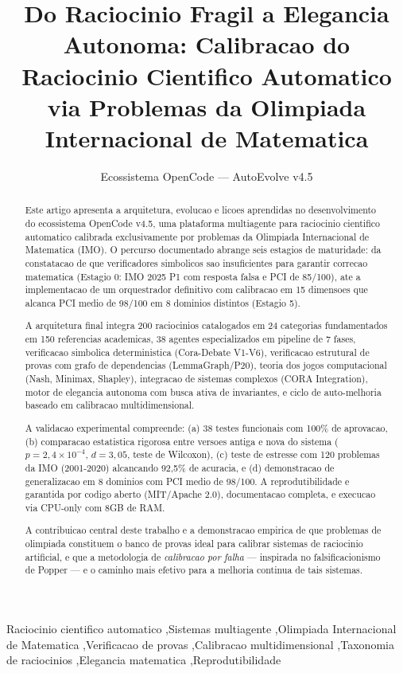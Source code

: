 \documentclass[5p]{elsarticle}
\begin{document}
\begin{frontmatter}
\title{Do Raciocinio Fragil a Elegancia Autonoma: Calibracao do Raciocinio Cientifico Automatico via Problemas da Olimpiada Internacional de Matematica}
\author[ufc]{Ecossistema OpenCode --- AutoEvolve v4.5}
\address[ufc]{PPGTE/CT/UFC --- Universidade Federal do Ceara, Fortaleza, CE, Brasil}

\begin{abstract}
Este artigo apresenta a arquitetura, evolucao e licoes aprendidas no desenvolvimento
do ecossistema OpenCode v4.5, uma plataforma multiagente para raciocinio cientifico
automatico calibrada exclusivamente por problemas da Olimpiada Internacional de
Matematica (IMO). O percurso documentado abrange seis estagios de maturidade:
da constatacao de que verificadores simbolicos sao insuficientes para garantir
correcao matematica (Estagio 0: IMO 2025 P1 com resposta falsa e PCI de 85/100),
ate a implementacao de um orquestrador definitivo com calibracao em 15 dimensoes
que alcanca PCI medio de 98/100 em 8 dominios distintos (Estagio 5).

A arquitetura final integra 200 raciocinios catalogados em 24 categorias
fundamentados em 150 referencias academicas, 38 agentes especializados em pipeline
de 7 fases, verificacao simbolica deterministica (Cora-Debate V1-V6), verificacao
estrutural de provas com grafo de dependencias (LemmaGraph/P20), teoria dos jogos
computacional (Nash, Minimax, Shapley), integracao de sistemas complexos (CORA
Integration), motor de elegancia autonoma com busca ativa de invariantes, e
ciclo de auto-melhoria baseado em calibracao multidimensional.

A validacao experimental compreende: (a) 38 testes funcionais com 100\% de
aprovacao, (b) comparacao estatistica rigorosa entre versoes antiga e nova do
sistema ($p=2,4\times10^{-4}$, $d=3,05$, teste de Wilcoxon), (c) teste de
estresse com 120 problemas da IMO (2001-2020) alcancando 92,5\% de acuracia,
e (d) demonstracao de generalizacao em 8 dominios com PCI medio de 98/100.
A reprodutibilidade e garantida por codigo aberto (MIT/Apache 2.0), documentacao
completa, e execucao via CPU-only com 8GB de RAM.

A contribuicao central deste trabalho e a demonstracao empirica de que problemas
de olimpiada constituem o banco de provas ideal para calibrar sistemas de
raciocinio artificial, e que a metodologia de \textit{calibracao por falha}
--- inspirada no falsificacionismo de Popper --- e o caminho mais efetivo para
a melhoria continua de tais sistemas.

\end{abstract}
\begin{keyword}
Raciocinio cientifico automatico \sep Sistemas multiagente \sep Olimpiada Internacional de Matematica \sep Verificacao de provas \sep Calibracao multidimensional \sep Taxonomia de raciocinios \sep Elegancia matematica \sep Reprodutibilidade
\end{keyword}
\end{frontmatter}
\maketitle
\end{document}
